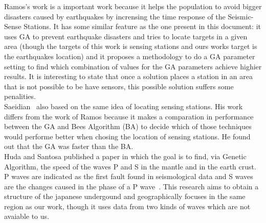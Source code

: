Ramos's work is a important work because it helps the population to avoid bigger disasters caused by earthquakes by incrensing the time response of the Seismic-Sense Stations. It has some similar feature as the one present in this document: it uses GA to prevent earthquake disasters and tries to locate targets in a given area (though the targets of this work is sensing stations and ours works target is the earthquakes location) and it proposes a methodology to do a GA parameter setting to find which combination of values for the GA parameters achieve highier results. It is interesting to state that once a solution places a station in an area that is not possible to be have sensors, this possible solution suffers some penalities.\\

Saeidian~\cite{saeidian2016evaluation} also based on the same idea of locating sensing stations. His work differs from the work of Ramos because it makes a comparation in performance between the GA and Bees Algorithm (BA) to decide which of those techniques would performe better when chosing the location of sensing stations. He found out that the GA was faster than the BA.\\

Huda and Santosa \cite{ijse5762} published a paper in which the goal is to find, via Genetic Algorithm, the speed of the waves P and S in the mantle and in the earth crust. P waves are indicated as the first fault found  in seismological data and S waves are the changes caused in the phase of a P wave~\cite{ijse5762}. This research aims to obtain a structure of the japanese undergound and geographically focuses in the same region as our work, though it uses data from two kinds of waves which are not avaiable to us.\\